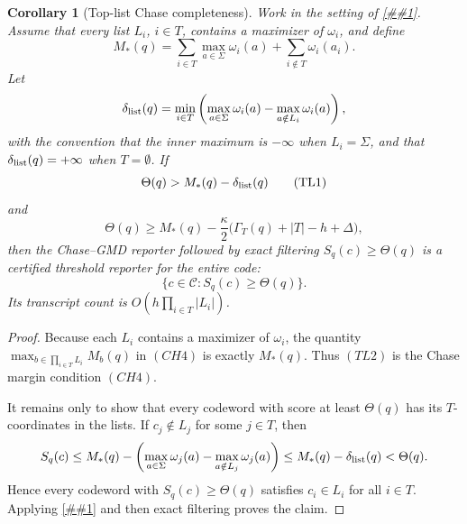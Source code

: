 \documentclass[10pt]{article}
\newcommand{\cref}[1]{\ref{##1}}
\newtheorem{corollary}[theorem]{Corollary}
\theoremstyle{definition}
\begin{document}
\begin{corollary}[Top-list Chase completeness]
   \label{cor:top-list-chase-completeness}
   Work in the setting of
   \cref{cor:chase-gmd-block-certificate}.  Assume that every list
   \(L_i\), \(i\in T\), contains a maximizer of \(\omega_i\), and define
   \[
      M_*(q)=
      \sum_{i\in T}\max_{a\in\Sigma}\omega_i(a)
      +
      \sum_{i\notin T}\omega_i(a_i).
   \]
   Let
   \[
      \delta_{\rm list}(q)
      =
      \min_{i\in T}
      \left(
         \max_{a\in\Sigma}\omega_i(a)
         -
         \max_{a\notin L_i}\omega_i(a)
      \right),
   \]
   with the convention that the inner maximum is \(-\infty\) when
   \(L_i=\Sigma\), and that \(\delta_{\rm list}(q)=+\infty\) when
   \(T=\emptyset\).  If
   \[
      \Theta(q)>M_*(q)-\delta_{\rm list}(q)
      \tag{TL1}
   \]
   and
   \[
      \Theta(q)\ge
      M_*(q)
      -
      \frac{\kappa}{2}\bigl(\Gamma_T(q)+|T|-h+\Delta\bigr),
      \tag{TL2}
   \]
   then the Chase--GMD reporter followed by exact filtering
   \(S_q(c)\ge\Theta(q)\) is a certified threshold reporter for the entire
   code:
   \[
      \{c\in\mathcal C:S_q(c)\ge\Theta(q)\}.
   \]
   Its transcript count is \(O(h\prod_{i\in T}|L_i|)\).
\end{corollary}

\begin{proof}
   Because each \(L_i\) contains a maximizer of \(\omega_i\), the quantity
   \(\max_{b\in\prod_{i\in T}L_i}M_b(q)\) in \((CH4)\) is exactly \(M_*(q)\).
   Thus \((TL2)\) is the Chase margin condition \((CH4)\).

   It remains only to show that every codeword with score at least
   \(\Theta(q)\) has its \(T\)-coordinates in the lists.  If \(c_j\notin L_j\)
   for some \(j\in T\), then
   \[
      S_q(c)
      \le
      M_*(q)
      -
      \left(
         \max_{a\in\Sigma}\omega_j(a)
         -
         \max_{a\notin L_j}\omega_j(a)
      \right)
      \le M_*(q)-\delta_{\rm list}(q)
      <\Theta(q).
   \]
   Hence every codeword with \(S_q(c)\ge\Theta(q)\) satisfies
   \(c_i\in L_i\) for all \(i\in T\).  Applying
   \cref{cor:chase-gmd-block-certificate} and then exact filtering proves the
   claim.
\end{proof}
\end{document}

